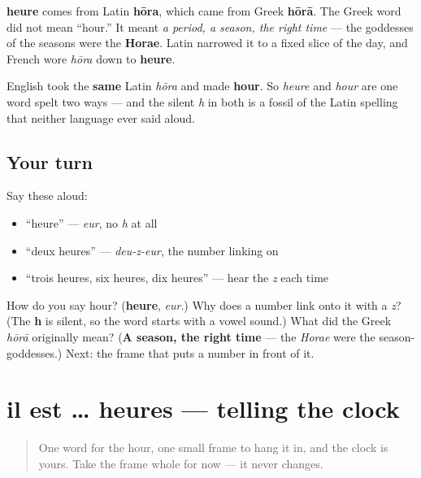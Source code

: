 \begin{cousinweb}
\textbf{heure} comes from Latin \textbf{hōra}, which came from Greek \textbf{hōrā}. The Greek word did not mean \textquotedblleft{}hour.\textquotedblright{} It meant \emph{a period, a season, the right time} — the goddesses of the seasons were the \textbf{Horae}. Latin narrowed it to a fixed slice of the day, and French wore \emph{hōra} down to \textbf{heure}.

English took the \textbf{same} Latin \emph{hōra} and made \textbf{hour}. So \emph{heure} and \emph{hour} are one word spelt two ways — and the silent \emph{h} in both is a fossil of the Latin spelling that neither language ever said aloud.
\end{cousinweb}

\subsection*{Your turn}
Say these aloud:

\begin{itemize}
\raggedright
  \item \textquotedblleft{}heure\textquotedblright{} — \emph{eur}, no \emph{h} at all
  \item \textquotedblleft{}deux heures\textquotedblright{} — \emph{deu-z-eur}, the number linking on
  \item \textquotedblleft{}trois heures, six heures, dix heures\textquotedblright{} — hear the \emph{z} each time
\end{itemize}

\begin{tcolorbox}[breakable,colback=teal!4,colframe=teal!35!black,title={Before you move on}]
How do you say hour? (\textbf{heure}, \emph{eur}.) Why does a number link onto it with a \emph{z}? (The \textbf{h} is silent, so the word starts with a vowel sound.) What did the Greek \emph{hōrā} originally mean? (\textbf{A season, the right time} — the \emph{Horae} were the season-goddesses.) Next: the frame that puts a number in front of it.
\end{tcolorbox}
\section[il est, … heures]{il est … heures — telling the clock}

\label{lesson:FR-C08-il-est}



\begin{quote}
One word for the hour, one small frame to hang it in, and the clock is yours. Take the frame whole for now — it never changes.
\end{quote}

